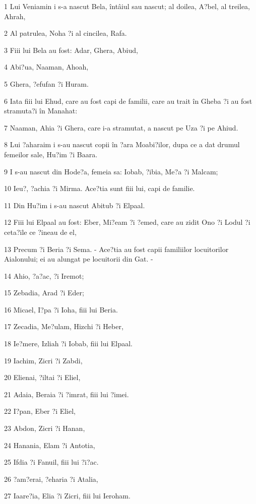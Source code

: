 \par 1 Lui Veniamin i s-a nascut Bela, întâiul sau nascut; al doilea, A?bel, al treilea, Ahrah,
\par 2 Al patrulea, Noha ?i al cincilea, Rafa.
\par 3 Fiii lui Bela au fost: Adar, Ghera, Abiud,
\par 4 Abi?ua, Naaman, Ahoah,
\par 5 Ghera, ?efufan ?i Huram.
\par 6 Iata fiii lui Ehud, care au fost capi de familii, care au trait în Gheba ?i au fost stramuta?i în Manahat:
\par 7 Naaman, Ahia ?i Ghera, care i-a stramutat, a nascut pe Uza ?i pe Ahiud.
\par 8 Lui ?aharaim i s-au nascut copii în ?ara Moabi?ilor, dupa ce a dat drumul femeilor sale, Hu?im ?i Baara.
\par 9 I s-au nascut din Hode?a, femeia sa: Iobab, ?ibia, Me?a ?i Malcam;
\par 10 Ieu?, ?achia ?i Mirma. Ace?tia sunt fiii lui, capi de familie.
\par 11 Din Hu?im i s-au nascut Abitub ?i Elpaal.
\par 12 Fiii lui Elpaal au fost: Eber, Mi?eam ?i ?emed, care au zidit Ono ?i Lodul ?i ceta?ile ce ?ineau de el,
\par 13 Precum ?i Beria ?i Sema. - Ace?tia au fost capii familiilor locuitorilor Aialonului; ei au alungat pe locuitorii din Gat. -
\par 14 Ahio, ?a?ac, ?i Iremot;
\par 15 Zebadia, Arad ?i Eder;
\par 16 Micael, I?pa ?i Ioha, fiii lui Beria.
\par 17 Zecadia, Me?ulam, Hizchi ?i Heber,
\par 18 Ie?mere, Izliah ?i Iobab, fiii lui Elpaal.
\par 19 Iachim, Zicri ?i Zabdi,
\par 20 Elienai, ?iltai ?i Eliel,
\par 21 Adaia, Beraia ?i ?imrat, fiii lui ?imei.
\par 22 I?pan, Eber ?i Eliel,
\par 23 Abdon, Zicri ?i Hanan,
\par 24 Hanania, Elam ?i Antotia,
\par 25 Ifdia ?i Fanuil, fiii lui ?i?ac.
\par 26 ?am?erai, ?eharia ?i Atalia,
\par 27 Iaare?ia, Elia ?i Zicri, fiii lui Ieroham.
